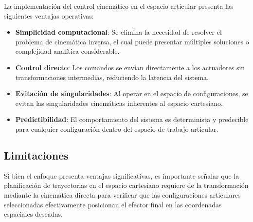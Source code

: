 La implementación del control cinemático en el espacio articular presenta las siguientes ventajas operativas:

\begin{itemize}
    \item \textbf{Simplicidad computacional}: Se elimina la necesidad de resolver el problema de cinemática inversa, el cual puede presentar múltiples soluciones o complejidad analítica considerable.
    
    \item \textbf{Control directo}: Los comandos se envían directamente a los actuadores sin transformaciones intermedias, reduciendo la latencia del sistema.
    
    \item \textbf{Evitación de singularidades}: Al operar en el espacio de configuraciones, se evitan las singularidades cinemáticas inherentes al espacio cartesiano.
    
    \item \textbf{Predictibilidad}: El comportamiento del sistema es determinista y predecible para cualquier configuración dentro del espacio de trabajo articular.
\end{itemize}

\subsection{Limitaciones}

Si bien el enfoque presenta ventajas significativas, es importante señalar que la planificación de trayectorias en el espacio cartesiano requiere de la transformación mediante la cinemática directa para verificar que las configuraciones articulares seleccionadas efectivamente posicionan el efector final en las coordenadas espaciales deseadas.